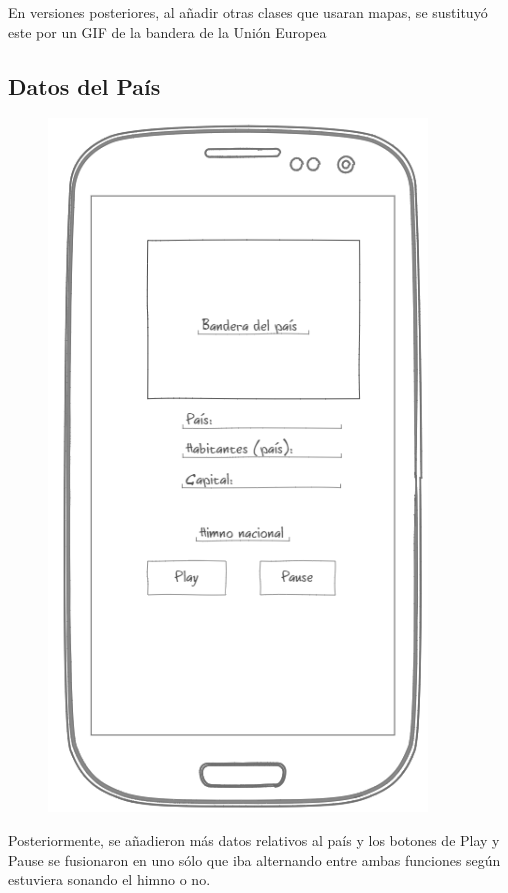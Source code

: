 \documentclass[letterpaper,twocolumn,openany,nodeprecatedcode,dvipsnames,nomultitoc]{dndbook}
\begin{document}
\begin{justify}
En versiones posteriores, al añadir otras clases que usaran mapas, se sustituyó este por un GIF de la bandera de la Unión Europea
\subsection{Datos del País}
\begin{figure}[h]
\centering
\includegraphics[scale = 0.2]{Manual/img/Datos Pais.png}
\end{figure}
Posteriormente, se añadieron más datos relativos al país y los botones de Play y Pause se fusionaron en uno sólo que iba alternando entre ambas funciones según estuviera sonando el himno o no.

\end{justify}
\end{document}
